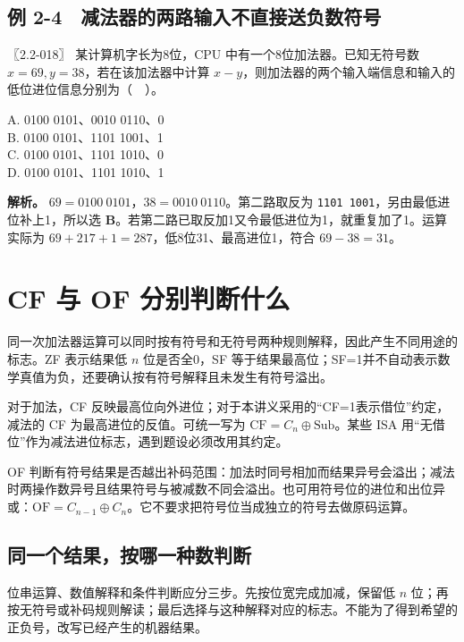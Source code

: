 \subsection{例 2-4　减法器的两路输入不直接送负数符号}\label{co-ex2-4}

\noindent{}〖2.2-018〗 某计算机字长为8位，CPU 中有一个8位加法器。已知无符号数 \(x=69,y=38\)，若在该加法器中计算 \(x-y\)，则加法器的两个输入端信息和输入的低位进位信息分别为（　）。

A. 0100 0101、0010 0110、0\\
B. 0100 0101、1101 1001、1\\
C. 0100 0101、1101 1010、0\\
D. 0100 0101、1101 1010、1


\textbf{解析。} \(69=0100\ 0101\)，\(38=0010\ 0110\)。第二路取反为 \allowbreak{}\texttt{1101\ 1001}，另由最低进位补上1，所以选 \textbf{B}。若第二路已取反加1又令最低进位为1，就重复加了1。运算实际为 \(69+217+1=287\)，低8位31、最高进位1，符合 \(69-38=31\)。

\section{CF 与 OF 分别判断什么}\label{co-02-05}

同一次加法器运算可以同时按有符号和无符号两种规则解释，因此产生不同用途的标志。ZF 表示结果低 \(n\) 位是否全0，SF 等于结果最高位；SF=1并不自动表示数学真值为负，还要确认按有符号解释且未发生有符号溢出。

对于加法，CF 反映最高位向外进位；对于本讲义采用的``CF=1表示借位''约定，减法的 CF 为最高进位的反值。可统一写为 \(\mathrm{CF}=C_n\oplus\mathrm{Sub}\)。某些 ISA 用``无借位''作为减法进位标志，遇到题设必须改用其约定。

OF 判断有符号结果是否越出补码范围：加法时同号相加而结果异号会溢出；减法时两操作数异号且结果符号与被减数不同会溢出。也可用符号位的进位和出位异或：\(\mathrm{OF}=C_{n-1}\oplus C_n\)。它不要求把符号位当成独立的符号去做原码运算。

\subsection{同一个结果，按哪一种数判断}\label{co-c02-h114}

位串运算、数值解释和条件判断应分三步。先按位宽完成加减，保留低 \(n\) 位；再按无符号或补码规则解读；最后选择与这种解释对应的标志。不能为了得到希望的正负号，改写已经产生的机器结果。

